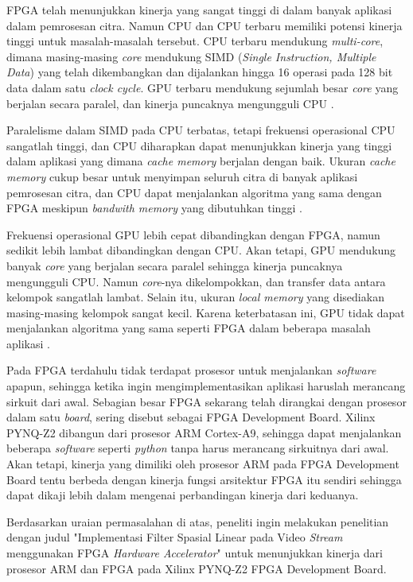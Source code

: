 FPGA telah menunjukkan kinerja yang sangat tinggi di dalam banyak aplikasi dalam pemrosesan citra. Namun CPU dan CPU terbaru memiliki potensi kinerja tinggi untuk masalah-masalah tersebut. CPU terbaru mendukung \textit{multi-core}, dimana masing-masing \textit{core} mendukung SIMD (\textit{Single Instruction, Multiple Data}) yang telah dikembangkan dan dijalankan hingga 16 operasi pada 128 bit data dalam satu \textit{clock cycle}. GPU terbaru mendukung sejumlah besar \textit{core} yang berjalan secara paralel, dan kinerja puncaknya mengungguli CPU \cite{lb:asano}.

\pagebreak

Paralelisme dalam SIMD pada CPU terbatas, tetapi frekuensi operasional CPU sangatlah tinggi, dan CPU diharapkan dapat menunjukkan kinerja yang tinggi dalam aplikasi yang dimana \textit{cache memory} berjalan dengan baik. Ukuran \textit{cache memory} cukup besar untuk menyimpan seluruh citra di banyak aplikasi pemrosesan citra, dan CPU dapat menjalankan algoritma yang sama dengan FPGA meskipun \textit{bandwith memory} yang dibutuhkan tinggi \cite{lb:asano}.

Frekuensi operasional GPU lebih cepat dibandingkan dengan FPGA, namun sedikit lebih lambat dibandingkan dengan CPU. Akan tetapi, GPU mendukung banyak \textit{core} yang berjalan secara paralel sehingga kinerja puncaknya mengungguli CPU. Namun \textit{core}-nya dikelompokkan, dan transfer data antara kelompok sangatlah lambat. Selain itu, ukuran \textit{local memory} yang disediakan masing-masing kelompok sangat kecil. Karena keterbatasan ini, GPU tidak dapat menjalankan algoritma yang sama seperti FPGA dalam beberapa masalah aplikasi \cite{lb:asano}.

Pada FPGA terdahulu tidak terdapat prosesor untuk menjalankan \textit{software} apapun, sehingga ketika ingin mengimplementasikan aplikasi haruslah merancang sirkuit dari awal. Sebagian besar FPGA sekarang telah dirangkai dengan prosesor dalam satu \textit{board}, sering disebut sebagai FPGA Development Board. Xilinx PYNQ-Z2 dibangun dari prosesor ARM Cortex-A9, sehingga dapat menjalankan beberapa \textit{software} seperti \textit{python} tanpa harus merancang sirkuitnya dari awal. Akan tetapi, kinerja yang dimiliki oleh prosesor ARM pada FPGA Development Board tentu berbeda dengan kinerja fungsi arsitektur FPGA itu sendiri sehingga dapat dikaji lebih dalam mengenai perbandingan kinerja dari keduanya.

Berdasarkan uraian permasalahan di atas, peneliti ingin melakukan penelitian dengan judul "Implementasi Filter Spasial Linear pada Video \textit{Stream} menggunakan FPGA \textit{Hardware Accelerator}" untuk menunjukkan kinerja dari prosesor ARM dan FPGA pada Xilinx PYNQ-Z2 FPGA Development Board.

